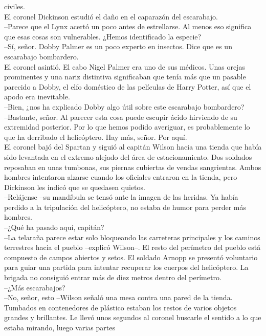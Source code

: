 civiles.\\
El coronel Dickinson estudió el daño en el caparazón del escarabajo.\\
--Parece que el Lynx acertó un poco antes de estrellarse. Al menos eso
significa que esas cosas son vulnerables. ¿Hemos identificado la
especie?\\
--Sí, señor. Dobby Palmer es un poco experto en insectos. Dice que es un
escarabajo bombardero.\\
El coronel asintió. El cabo Nigel Palmer era uno de sus médicos. Unas
orejas prominentes y una nariz distintiva significaban que tenía más que
un pasable parecido a Dobby, el elfo doméstico de las películas de Harry
Potter, así que el apodo era inevitable.\\
--Bien, ¿nos ha explicado Dobby algo útil sobre este escarabajo
bombardero?\\
--Bastante, señor. Al parecer esta cosa puede escupir ácido hirviendo de
su extremidad posterior. Por lo que hemos podido averiguar, es
probablemente lo que ha derribado el helicóptero. Hay más, señor. Por
aquí.\\
El coronel bajó del Spartan y siguió al capitán Wilson hacia una tienda
que había sido levantada en el extremo alejado del área de
estacionamiento. Dos soldados reposaban en unas tumbonas, sus piernas
cubiertas de vendas sangrientas. Ambos hombres intentaron alzarse cuando
los oficiales entraron en la tienda, pero Dickinson les indicó que se
quedasen quietos.\\
--Relájense --su mandíbula se tensó ante la imagen de las heridas. Ya
había perdido a la tripulación del helicóptero, no estaba de humor para
perder más hombres.\\
--¿Qué ha pasado aquí, capitán?\\
--La telaraña parece estar solo bloqueando las carreteras principales y
los caminos terrestres hacia el pueblo --explicó Wilson--. El resto del
perímetro del pueblo está compuesto de campos abiertos y setos. El
soldado Arnopp se presentó voluntario para guiar una partida para
intentar recuperar los cuerpos del helicóptero. La brigada no consiguió
entrar más de diez metros dentro del perímetro.\\
--¿Más escarabajos?\\
--No, señor, esto --Wilson señaló una mesa contra una pared de la
tienda. Tumbados en contenedores de plástico estaban los restos de
varios objetos grandes y brillantes. Le llevó unos segundos al coronel
buscarle el sentido a lo que estaba mirando, luego varias partes
